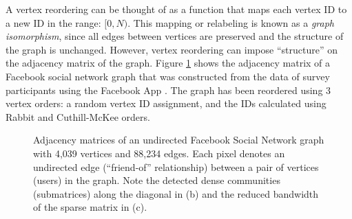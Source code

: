\par A vertex reordering can be thought of as a function that maps each vertex ID to a new ID in the range: $[0, N)$. This mapping or relabeling is known as a \textit{graph isomorphism}, since all edges between vertices are preserved and the structure of the graph is unchanged. However, vertex reordering can impose ``structure'' on the adjacency matrix of the graph. Figure \ref{fig:fb_adjmats} shows the adjacency matrix of a Facebook social network graph that was constructed from the data of survey participants using the Facebook App \cite{leskovec2012learning}. The graph has been reordered using 3 vertex orders: a random vertex ID assignment, and the IDs calculated using Rabbit and Cuthill-McKee orders. 

\begin{figure}[!htp]

  \centering
  \hfil   
  \hfil
  \caption{Adjacency matrices of an undirected Facebook Social Network graph with 4,039 vertices and 88,234 edges. Each pixel denotes an undirected edge (``friend-of'' relationship) between a pair of vertices (users) in the graph. Note the detected dense communities (submatrices) along the diagonal in (b) and the reduced bandwidth of the sparse matrix in (c). }\label{fig:fb_adjmats}
  \end{figure}

